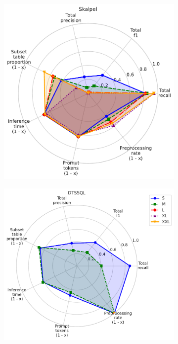 \begin{figure}
\begin{subfigure}{0.235\linewidth}
  \end{subfigure}
    \begin{subfigure}{0.235\linewidth}
    \centering
    \includegraphics[width=\linewidth]{figures/method_radar_charts/skalpel_radar.pdf}
  \end{subfigure}
  \begin{subfigure}{0.27\linewidth}
    \centering
    \includegraphics[width=\linewidth]{figures/method_radar_charts/dtssql_radar.pdf}

\end{subfigure}
\end{figure}
